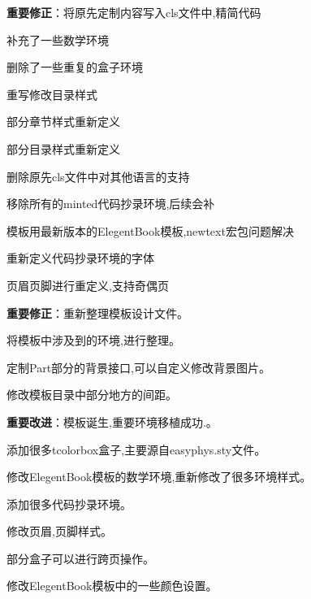 
\begin{change}
 \item \textbf{重要修正}：将原先定制内容写入cls文件中,精简代码
\item 补充了一些数学环境
\item 删除了一些重复的盒子环境
\item 重写修改目录样式
\item {}
\item 部分章节样式重新定义
\item 部分目录样式重新定义
\item 删除原先cls文件中对其他语言的支持
\item 移除所有的minted代码抄录环境,后续会补
\item 模板用最新版本的ElegentBook模板,newtext宏包问题解决
\item 重新定义代码抄录环境的字体
\item 页眉页脚进行重定义,支持奇偶页
\end{change}


\begin{change}
  \item \textbf{重要修正}：重新整理模板设计文件。
  \item 将模板中涉及到的环境,进行整理。
  \item 定制Part部分的背景接口,可以自定义修改背景图片。
  \item 修改模板目录中部分地方的间距。
\end{change}



\begin{change}
  \item \textbf{重要改进}：模板诞生,重要环境移植成功.。
  \item 添加很多tcolorbox盒子,主要源自easyphys.sty文件。
  \item 修改ElegentBook模板的数学环境,重新修改了很多环境样式。
  \item 添加很多代码抄录环境。
  \item 修改页眉,页脚样式。
  \item 部分盒子可以进行跨页操作。
  \item 修改ElegentBook模板中的一些颜色设置。
\end{change}

